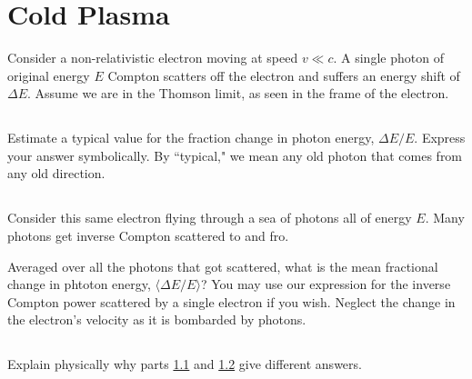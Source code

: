 \documentclass[11pt]{article}
\begin{document}
\section{Cold Plasma}

Consider a non-relativistic electron moving at speed $v\ll c$.  A single photon
of original energy $E$ Compton scatters off the electron and suffers an energy shift
of $\Delta E$.  Assume we are in the Thomson limit, as seen in the frame of the electron.

\subsection{}\label{sec:parta}
Estimate a typical value for the fraction change in photon energy, $\Delta E/E$.  Express your
answer symbolically.  By ``typical," we mean any old photon that comes from any old direction.

\subsection{}\label{sec:partb}
Consider this same electron flying through a sea of photons all of energy $E$.  Many photons
get inverse Compton scattered to and fro.

Averaged over all the photons that got scattered, what is the mean fractional change
in phtoton energy, $\langle \Delta E/E\rangle$?  You may use our expression for the
inverse Compton power scattered by a single electron if you wish.  Neglect the change in the electron's velocity
as it is bombarded by photons.

\subsection{}
Explain physically why parts \ref{sec:parta} and \ref{sec:partb} give different answers.
\end{document}
